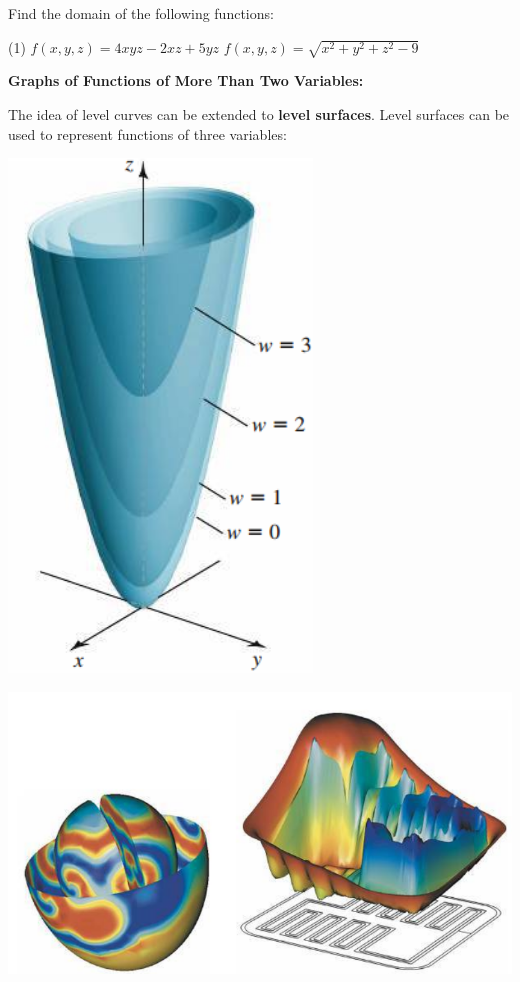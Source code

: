 \documentclass[mathNotesPreamble]{subfiles}
\begin{document}
  \begin{ex*}
    Find the domain of the following functions:
  \end{ex*}
  \begin{tasks}[after-item-skip=\stretch{1}, label=](1)
    \task $f(x,y,z)=4xyz-2xz+5yz$
    \task $f(x,y,z)=\sqrt{x^2+y^2+z^2-9}$
  \end{tasks}
  \pagebreak

  \textbf{Graphs of Functions of More Than Two Variables:}

  The idea of level curves can be extended to \textbf{level surfaces}. Level surfaces can be used to represent functions of three variables:
  \begin{center}
    \includegraphics[width=0.25\linewidth]{images/briggs_15_01/fig15_17}
  \end{center}

  \begin{center}
    \includegraphics[width=0.85\linewidth]{images/briggs_15_01/fig15_18}
  \end{center}

  \pagebreak
  
\end{document}
